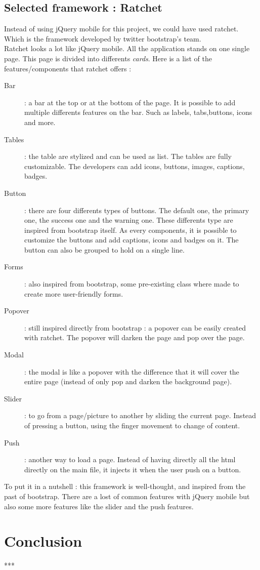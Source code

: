 \documentclass[12pt]{report}%
\begin{document}
\section{Selected framework : Ratchet}
Instead of using jQuery mobile for this project, we could have used ratchet. Which is the framework developed by twitter bootstrap's team.\\
Ratchet looks a lot like jQuery mobile. All the application stands on one single page. This page is divided into differents \textit{cards}.
Here is a list of the features/components that ratchet offers :
\begin{description}
	\item[Bar] : a bar at the top or at the bottom of the page. It is possible to add multiple differents features on the bar. Such as  labels, tabs,buttons, icons and more.
	\item[Tables] : the table are stylized and can be used as list. The tables are fully customizable. The developers can add icons, buttons, images, captions, badges.
	\item[Button] : there are four differents types of buttons. The default one, the primary one, the success one and the warning one. These differents type are inspired from bootstrap itself. As every components, it is possible to customize the buttons and add captions, icons and badges on it. The button can also be grouped to hold on a single line.
	\item[Forms] : also inspired from bootstrap, some pre-existing class where made to create more user-friendly forms.
	\item[Popover] : still inspired directly from bootstrap : a popover can be easily created with ratchet. The popover will darken the page and pop over the page.
	\item[Modal] : the modal is like a popover with the difference that it will cover the entire page (instead of only pop and darken the background page).
	\item[Slider] : to go from a page/picture to another by sliding the current page. Instead of pressing a button, using the finger movement to change of content.
	\item[Push] : another way to load a page. Instead of having directly all the html directly on the main file, it injects it when the user push on a button.
\end{description}
To put it in a nutshell : this framework is well-thought, and inspired from the past of bootstrap. There are a lost of common features with jQuery mobile but also some more features like the slider and the push features.

\chapter{Conclusion}
***

\clearpage
\end{document}
